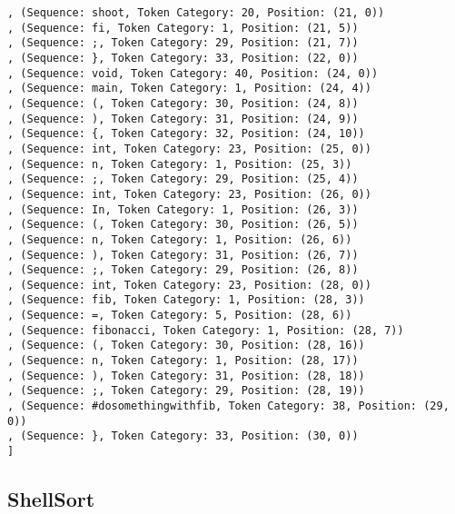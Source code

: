 \documentclass[a4paper, 12pt, article]{memoir}
\begin{document}
\begin{lstlisting}
, (Sequence: shoot, Token Category: 20, Position: (21, 0))
, (Sequence: fi, Token Category: 1, Position: (21, 5))
, (Sequence: ;, Token Category: 29, Position: (21, 7))
, (Sequence: }, Token Category: 33, Position: (22, 0))
, (Sequence: void, Token Category: 40, Position: (24, 0))
, (Sequence: main, Token Category: 1, Position: (24, 4))
, (Sequence: (, Token Category: 30, Position: (24, 8))
, (Sequence: ), Token Category: 31, Position: (24, 9))
, (Sequence: {, Token Category: 32, Position: (24, 10))
, (Sequence: int, Token Category: 23, Position: (25, 0))
, (Sequence: n, Token Category: 1, Position: (25, 3))
, (Sequence: ;, Token Category: 29, Position: (25, 4))
, (Sequence: int, Token Category: 23, Position: (26, 0))
, (Sequence: In, Token Category: 1, Position: (26, 3))
, (Sequence: (, Token Category: 30, Position: (26, 5))
, (Sequence: n, Token Category: 1, Position: (26, 6))
, (Sequence: ), Token Category: 31, Position: (26, 7))
, (Sequence: ;, Token Category: 29, Position: (26, 8))
, (Sequence: int, Token Category: 23, Position: (28, 0))
, (Sequence: fib, Token Category: 1, Position: (28, 3))
, (Sequence: =, Token Category: 5, Position: (28, 6))
, (Sequence: fibonacci, Token Category: 1, Position: (28, 7))
, (Sequence: (, Token Category: 30, Position: (28, 16))
, (Sequence: n, Token Category: 1, Position: (28, 17))
, (Sequence: ), Token Category: 31, Position: (28, 18))
, (Sequence: ;, Token Category: 29, Position: (28, 19))
, (Sequence: #dosomethingwithfib, Token Category: 38, Position: (29, 0))
, (Sequence: }, Token Category: 33, Position: (30, 0))
]
\end{lstlisting}

\subsection{ShellSort}
\label{subsec:shell}
\end{document}
